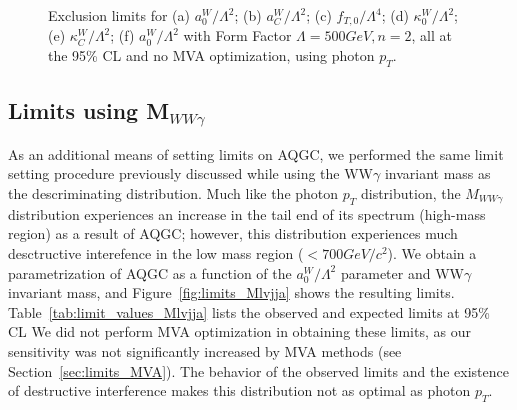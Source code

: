 \begin{figure}[hb]
\begin{center}
{  }
    \caption{ Exclusion limits for (a) $a_{0}^{W}/\Lambda^{2}$; (b) $a_{C}^{W}/\Lambda^{2}$; (c) $f_{T,0}/\Lambda^{4}$; (d) $\kappa_{0}^{W}/\Lambda^{2}$; (e) $\kappa_{C}^{W}/\Lambda^{2}$; (f) $a_{0}^{W}/\Lambda^{2}$ with Form Factor $\Lambda = 500 GeV, n = 2$, all at the 95\% CL and no MVA optimization, using photon $p_{T}$.}
    \label{fig:limitshape1d_noMVA}
  \end{center}
\end{figure}


\subsection{Limits using M$_{WW\gamma}$}
\label{sec:limits_Mlvjja}
As an additional means of setting limits on AQGC, we performed the same
limit setting procedure previously discussed while using the WW$\gamma$
invariant mass as the descriminating distribution. Much like the photon
$p_{T}$ distribution, the $M_{WW\gamma}$ distribution experiences an
increase in the tail end of its spectrum (high-mass region) as a result of
AQGC; however, this distribution experiences much desctructive interefence
in the low mass region ($< 700 GeV/c^{2}$). We obtain a parametrization of 
AQGC as a function of the $a_{0}^{W}/\Lambda^{2}$ parameter
and WW$\gamma$ invariant mass, and Figure~\ref{fig:limits_Mlvjja} shows the 
resulting limits. Table~\ref{tab:limit_values_Mlvjja} lists the observed and expected limits at 
95\% CL We did not perform
MVA optimization in obtaining these limits, as our sensitivity was not
significantly increased by MVA methods (see Section~\ref{sec:limits_MVA}).
The behavior of the observed limits and the existence of destructive
interference makes this distribution not as optimal as photon $p_{T}$.

\begin{table}[htb]
\centering
{}
  \caption{95\% CL shape-based exclusion limits listed for both the muon and electron channels of the AQGC parameter $a_{0}^{W}/\Lambda^{2}$, using $M_{WW\gamma}$ and without MVA optimization.}
  \label{tab:limit_values_Mlvjja}
\end{table}

